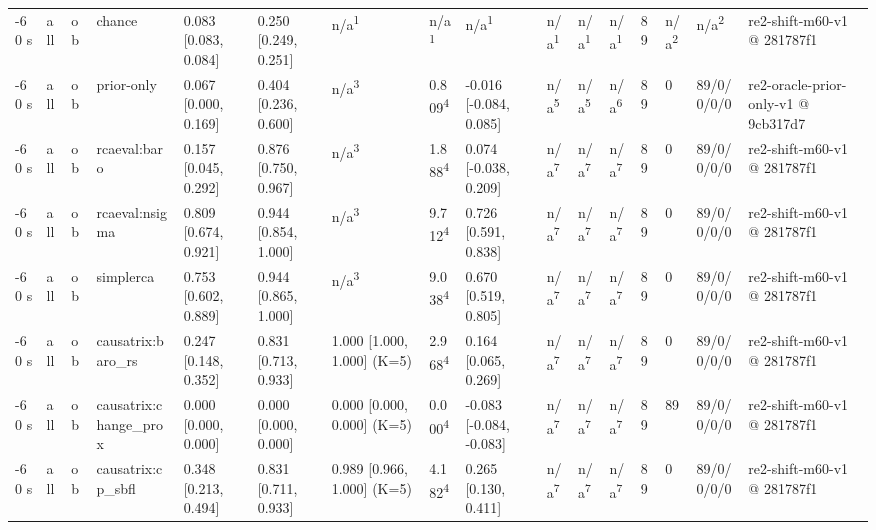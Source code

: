 \begin{table}[t]
\begin{tabular}{llllllllllllllll}
-60 s & all & ob & chance & 0.083 [0.083, 0.084] & 0.250 [0.249, 0.251] & n/a\textsuperscript{1} & n/a\textsuperscript{1} & n/a\textsuperscript{1} & n/a\textsuperscript{1} & n/a\textsuperscript{1} & n/a\textsuperscript{1} & 89 & n/a\textsuperscript{2} & n/a\textsuperscript{2} & re2-shift-m60-v1 @ 281787f1 \\
-60 s & all & ob & prior-only & 0.067 [0.000, 0.169] & 0.404 [0.236, 0.600] & n/a\textsuperscript{3} & 0.809\textsuperscript{4} & -0.016 [-0.084, 0.085] & n/a\textsuperscript{5} & n/a\textsuperscript{5} & n/a\textsuperscript{6} & 89 & 0 & 89/0/0/0/0 & re2-oracle-prior-only-v1 @ 9cb317d7 \\
-60 s & all & ob & rcaeval:baro & 0.157 [0.045, 0.292] & 0.876 [0.750, 0.967] & n/a\textsuperscript{3} & 1.888\textsuperscript{4} & 0.074 [-0.038, 0.209] & n/a\textsuperscript{7} & n/a\textsuperscript{7} & n/a\textsuperscript{7} & 89 & 0 & 89/0/0/0/0 & re2-shift-m60-v1 @ 281787f1 \\
-60 s & all & ob & rcaeval:nsigma & 0.809 [0.674, 0.921] & 0.944 [0.854, 1.000] & n/a\textsuperscript{3} & 9.712\textsuperscript{4} & 0.726 [0.591, 0.838] & n/a\textsuperscript{7} & n/a\textsuperscript{7} & n/a\textsuperscript{7} & 89 & 0 & 89/0/0/0/0 & re2-shift-m60-v1 @ 281787f1 \\
-60 s & all & ob & simplerca & 0.753 [0.602, 0.889] & 0.944 [0.865, 1.000] & n/a\textsuperscript{3} & 9.038\textsuperscript{4} & 0.670 [0.519, 0.805] & n/a\textsuperscript{7} & n/a\textsuperscript{7} & n/a\textsuperscript{7} & 89 & 0 & 89/0/0/0/0 & re2-shift-m60-v1 @ 281787f1 \\
-60 s & all & ob & causatrix:baro\_rs & 0.247 [0.148, 0.352] & 0.831 [0.713, 0.933] & 1.000 [1.000, 1.000] (K=5) & 2.968\textsuperscript{4} & 0.164 [0.065, 0.269] & n/a\textsuperscript{7} & n/a\textsuperscript{7} & n/a\textsuperscript{7} & 89 & 0 & 89/0/0/0/0 & re2-shift-m60-v1 @ 281787f1 \\
-60 s & all & ob & causatrix:change\_prox & 0.000 [0.000, 0.000] & 0.000 [0.000, 0.000] & 0.000 [0.000, 0.000] (K=5) & 0.000\textsuperscript{4} & -0.083 [-0.084, -0.083] & n/a\textsuperscript{7} & n/a\textsuperscript{7} & n/a\textsuperscript{7} & 89 & 89 & 89/0/0/0/0 & re2-shift-m60-v1 @ 281787f1 \\
-60 s & all & ob & causatrix:cp\_sbfl & 0.348 [0.213, 0.494] & 0.831 [0.711, 0.933] & 0.989 [0.966, 1.000] (K=5) & 4.182\textsuperscript{4} & 0.265 [0.130, 0.411] & n/a\textsuperscript{7} & n/a\textsuperscript{7} & n/a\textsuperscript{7} & 89 & 0 & 89/0/0/0/0 & re2-shift-m60-v1 @ 281787f1 \\

\end{tabular}
\end{table}
